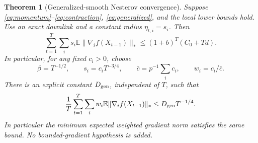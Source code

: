 \documentclass[11pt]{article}
\newtheorem{theorem}{Theorem}
\newcommand{\E}{\mathbb E}
\newcommand{\nuc}[1]{\lVert #1\rVert_*}
\newcommand{\barc}{\bar c}
\begin{document}
\begin{theorem}[Generalized-smooth Nesterov convergence]\label{thm:gen}
Suppose \eqref{eq:momentum}--\eqref{eq:contraction},
\eqref{eq:generalized}, and the local lower bounds
hold. Use an exact downlink and a constant radius $\eta_{t,i}=s_i$.
Then
\begin{equation}\label{eq:gen-finite}
 \sum_{t=1}^T\sum_i s_i\E\nuc{\nabla_i f(X_{t-1})}
 \le(1+b)^T(C_0+Td).
\end{equation}
In particular, for any fixed $c_i>0$, choose
\begin{equation}\label{eq:gen-tuning}
 \beta=T^{-1/2},\qquad s_i=c_iT^{-3/4},\qquad
 \barc=p^{-1}\sum_ic_i,\qquad w_i=c_i/\barc.
\end{equation}
There is an explicit constant $D_{\rm gen}$, independent of $T$, such that
\begin{equation}\label{eq:gen-rate}
 \frac1T\sum_{t=1}^T\sum_iw_i\E\nuc{\nabla_i f(X_{t-1})}
 \le D_{\rm gen}T^{-1/4}.
\end{equation}
In particular the minimum expected weighted gradient norm satisfies
the same bound. No bounded-gradient hypothesis is added.
\end{theorem}
\end{document}
